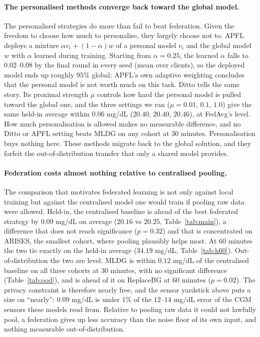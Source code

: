 \documentclass[10pt,letterpaper]{article}
\begin{document}
\paragraph{The personalised methods converge back toward the global model.} The
personalised strategies do more than fail to beat federation. Given the freedom
to choose how much to personalise, they largely choose not to. APFL deploys a
mixture $\alpha v_i + (1-\alpha) w$ of a personal model $v_i$ and the global model
$w$ with $\alpha$ learned during training. Starting from $\alpha = 0.25$, the
learned $\alpha$ falls to $0.02$--$0.08$ by the final round in every seed
(mean over clients), so the deployed model ends up roughly $95\%$ global: APFL's
own adaptive weighting concludes that the personal model is not worth much on this
task. Ditto tells the same story. Its proximal strength $\mu$ controls how
hard the personal model is pulled toward the global one, and the three
settings we ran ($\mu = 0.01$, $0.1$, $1.0$) give the same held-in average
within $0.06$ mg/dL ($20.40$, $20.40$, $20.46$), at FedAvg's level. How much
personalisation is allowed makes no measurable difference, and no Ditto or
APFL setting beats MLDG on any cohort at 30 minutes. Personalisation buys
nothing here. These methods migrate back to the global solution, and they
forfeit the out-of-distribution transfer that only a shared model provides.

\paragraph{Federation costs almost nothing relative to centralised pooling.}
The comparison that motivates federated learning is not only against local
training but against the centralised model one would train if pooling raw data
were allowed. Held-in, the centralised baseline is ahead of the best federated
strategy by $0.09$ mg/dL on average ($20.16$ vs $20.25$,
Table~\ref{tab:main}), a difference that does not reach significance
($p = 0.32$) and that is concentrated on ARISES, the smallest cohort, where
pooling plausibly helps most. At 60 minutes the two tie exactly on the
held-in average ($34.19$ mg/dL, Table~\ref{tab:h60}). Out-of-distribution
the two are level. MLDG is within $0.12$ mg/dL of the centralised baseline on all
three cohorts at 30 minutes, with no significant difference
(Table~\ref{tab:ood}), and is ahead of it on ReplaceBG at 60 minutes
($p = 0.02$). The privacy constraint is therefore nearly free, and the sensor
yardstick above puts a size on ``nearly'': $0.09$ mg/dL is under $1\%$ of the
$12$--$14$ mg/dL error of the CGM sensors these models read from. Relative to
pooling raw data it could not lawfully pool, a federation gives up less
accuracy than the noise floor of its own input, and nothing measurable
out-of-distribution.
\end{document}
